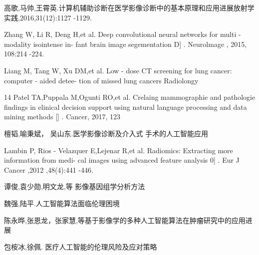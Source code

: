 \documentclass{article}
\begin{document}
 
高歌,马帅,王霄英.计算机辅助诊断在医学影像诊断中的基本原理和应用进展放射学实践,2016,31(12):1127 -1129.\par



 Zhang W, Li R, Deng H,et al. Deep convolutional
neural networks for multi - modality isointense in- fant brain image segementation D] . Neurolmage ,
2015, 108:214 -224.\par



 Liang M, Tang W, Xu DM,et al. Low - dose CT
screening for lung cancer: computer - aided detee-
tion of missed lung cancers Radiolongy \par

14 Patel TA,Puppala M,Ogunti RO,et al. Crelaing
mammographie and pathologie findings in elinical
decision support using natural language processing
and data mining methods [] . Cancer, 2017, 123\par


檀韬,喻秉斌， 吴山东.医学影像诊断及介入式
手术的人工智能应用\par



 Lambin P, Rios - Velazquer E,Lejenar R,et al.
Radiomics: Extracting more information from medi-
cal images using advanced feature analysis 0] . Eur
J Cancer ,2012 ,48(4):441 -446.\par

谭俊,袁少勋,明文龙,等 影像基因组学分析方法\par

魏强,陆平.人工智能算法面临伦理困境\par


陈永晔,张恩龙，张家慧,等基于影像学的多种人工智能算法在肿瘤研究中的应用进展\par


包桉冰,徐佩. 医疗人工智能的伦理风险及应对策略\par





\end{document}
